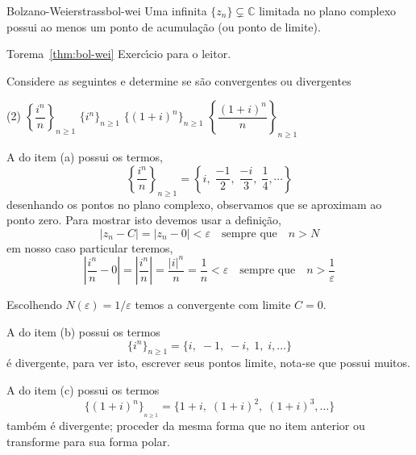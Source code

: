 \begin{theoc}{Bolzano-Weierstrass}{bol-wei}
Uma \seq  infinita $\{z_n\}\subsetneq\mathbb{C}$ limitada no plano complexo possui ao menos um ponto de acumula\c{c}\~{a}o (ou ponto de
limite).
\end{theoc}

\begin{prvc}{Torema~\ref{thm:bol-wei}}{}
 Exerc\'{\i}cio para o leitor.
\end{prvc}

\begin{exer}
 Considere as seguintes \seqs e determine se s\~{a}o convergentes ou divergentes
\begin{tasks}[label=(\alph*),item-indent=4em,label-width=4ex,ref=(\alph*)](2)
\task \(\left\{\dfrac{i^n}{n}\right\}_{n\geq 1}\)
\task \(\{i^n\}_{n\geq 1}\)
\task \(\{(1+i)^n\}_{n\geq 1}\)
\task \(\left\{\dfrac{(1+i)^n}{n} \right\}_{n\geq 1}\)
\end{tasks}
\end{exer}

\solo  A \seq do item (a) possui os termos,
\begin{equation*}
\left\{\frac{i^n}{n}\right\}_{n\geq 1}=\left\{i,\; \frac{-1}{2},\; \frac{-i}{3},\; \frac{1}{4},\cdots\right\}
\end{equation*}
desenhando os pontos no plano complexo, observamos que se aproximam ao ponto zero. Para mostrar isto
devemos usar a defini\c{c}\~{a}o,
\begin{equation*}
    |z_n-C|=|z_n-0|<\varepsilon\quad\text{sempre que}\quad n > N
\end{equation*}
em nosso caso particular teremos,
\begin{equation*}
\left|\frac{i^n}{n}-0\right|=\left|\frac{i^n}{n}\right|=\frac{|i|^n}{n}=\frac{1}{n}<\varepsilon\quad\text{sempre que}\quad n >\frac{1}{\varepsilon}
\end{equation*}

Escolhendo $N(\varepsilon)=1/\varepsilon$ temos a \seq  convergente com limite $C=0$.

A \seq do item (b) possui os termos
 \begin{equation*}
 \{i^n\}_{n\geq 1}=\{i,\; -1,\; -i,\;  1,\;  i,\ldots  \}
 \end{equation*}
\'e divergente, para ver isto, escrever seus pontos limite, nota-se que possui muitos.

A \seq do item (c) possui os termos
\begin{equation*}
\{(1+i)^n\}_{_{n\geq 1}}=\{1+i,\; (1+i)^2,\; (1+i)^3,\ldots \}
\end{equation*}
tamb\'em \'e divergente; proceder da mesma forma que no item anterior ou transforme para sua forma polar.

